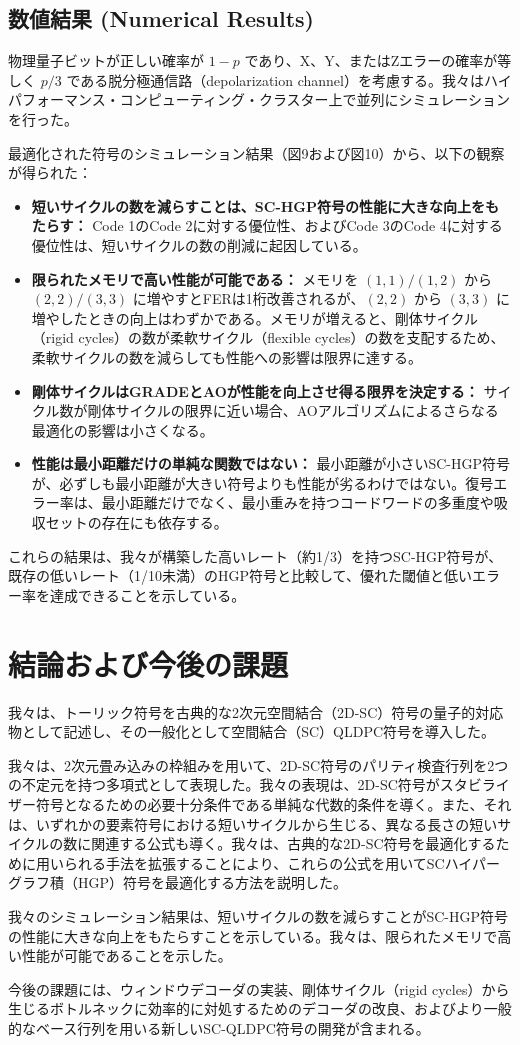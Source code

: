 \documentclass[a4paper,11pt]{article}
\begin{document}
\subsection{数値結果 (Numerical Results)}
物理量子ビットが正しい確率が $1-p$ であり、X、Y、またはZエラーの確率が等しく $p/3$ である脱分極通信路（depolarization channel）を考慮する。我々はハイパフォーマンス・コンピューティング・クラスター上で並列にシミュレーションを行った。

最適化された符号のシミュレーション結果（図9および図10）から、以下の観察が得られた：
\begin{itemize}
    \item \textbf{短いサイクルの数を減らすことは、SC-HGP符号の性能に大きな向上をもたらす：} Code 1のCode 2に対する優位性、およびCode 3のCode 4に対する優位性は、短いサイクルの数の削減に起因している。
    \item \textbf{限られたメモリで高い性能が可能である：} メモリを $(1,1)/(1,2)$ から $(2,2)/(3,3)$ に増やすとFERは1桁改善されるが、$(2,2)$ から $(3,3)$ に増やしたときの向上はわずかである。メモリが増えると、剛体サイクル（rigid cycles）の数が柔軟サイクル（flexible cycles）の数を支配するため、柔軟サイクルの数を減らしても性能への影響は限界に達する。
    \item \textbf{剛体サイクルはGRADEとAOが性能を向上させ得る限界を決定する：} サイクル数が剛体サイクルの限界に近い場合、AOアルゴリズムによるさらなる最適化の影響は小さくなる。
    \item \textbf{性能は最小距離だけの単純な関数ではない：} 最小距離が小さいSC-HGP符号が、必ずしも最小距離が大きい符号よりも性能が劣るわけではない。復号エラー率は、最小距離だけでなく、最小重みを持つコードワードの多重度や吸収セットの存在にも依存する。
\end{itemize}

これらの結果は、我々が構築した高いレート（約1/3）を持つSC-HGP符号が、既存の低いレート（1/10未満）のHGP符号と比較して、優れた閾値と低いエラー率を達成できることを示している。

\section{結論および今後の課題}
我々は、トーリック符号を古典的な2次元空間結合（2D-SC）符号の量子的対応物として記述し、その一般化として空間結合（SC）QLDPC符号を導入した。

我々は、2次元畳み込みの枠組みを用いて、2D-SC符号のパリティ検査行列を2つの不定元を持つ多項式として表現した。我々の表現は、2D-SC符号がスタビライザー符号となるための必要十分条件である単純な代数的条件を導く。また、それは、いずれかの要素符号における短いサイクルから生じる、異なる長さの短いサイクルの数に関連する公式も導く。我々は、古典的な2D-SC符号を最適化するために用いられる手法を拡張することにより、これらの公式を用いてSCハイパーグラフ積（HGP）符号を最適化する方法を説明した。

我々のシミュレーション結果は、短いサイクルの数を減らすことがSC-HGP符号の性能に大きな向上をもたらすことを示している。我々は、限られたメモリで高い性能が可能であることを示した。

今後の課題には、ウィンドウデコーダの実装、剛体サイクル（rigid cycles）から生じるボトルネックに効率的に対処するためのデコーダの改良、およびより一般的なベース行列を用いる新しいSC-QLDPC符号の開発が含まれる。
\end{document}
